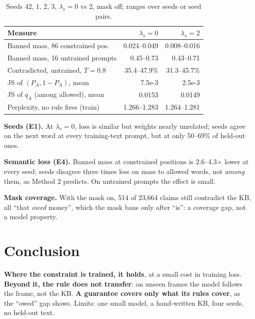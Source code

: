 \documentclass[letterpaper, 10pt, conference]{IEEEtran}
\begin{document}
\begin{table}[!htb]
\caption{Seeds 42, 1, 2, 3, $\lambda_s{=}0$ vs 2, mask off; ranges over seeds or seed pairs.}\label{tab:e4}
\centering\footnotesize\setlength{\tabcolsep}{3pt}
\begin{tabular}{@{}lrr@{}}
\toprule
Measure & $\lambda_s{=}0$ & $\lambda_s{=}2$\\
\midrule
Banned mass, 86 constrained pos. & 0.024--0.049 & 0.008--0.016\\
Banned mass, 16 untrained prompts & 0.45--0.73 & 0.43--0.71\\
Contradicted, untrained, $T{=}0.8$ & 35.4--47.9\% & 31.3--45.7\%\\
JS of $(P_A,1{-}P_A)$, mean & 7.5e-3 & 2.5e-3\\
JS of $q_A$ (among allowed), mean & 0.0153 & 0.0149\\
Perplexity, no rule fires (train) & 1.266--1.283 & 1.264--1.281\\
\bottomrule
\end{tabular}
\end{table}

\textbf{Seeds (E1).} At $\lambda_s{=}0$, loss is similar but weights nearly unrelated; seeds agree on the next word at every training-text prompt, but at only 50--69\% of held-out ones.

\textbf{Semantic loss (E4).} Banned mass at constrained positions is 2.6--4.3$\times$ lower at every seed; seeds disagree three times less on mass to allowed words, not \emph{among} them, as Method 2 predicts. On untrained prompts the effect is small.

\textbf{Mask coverage.} With the mask on, 514 of 23,664 claims still contradict the KB, all ``that \emph{owed} money'', which the mask bans only after ``is'': a coverage gap, not a model property.

\section{Conclusion}
\textbf{Where the constraint is trained, it holds}, at a small cost in training loss. \textbf{Beyond it, the rule does not transfer}: on unseen frames the model follows the frame, not the KB. \textbf{A guarantee covers only what its rules cover}, as the ``owed'' gap shows. Limits: one small model, a hand-written KB, four seeds, no held-out text.
\end{document}
